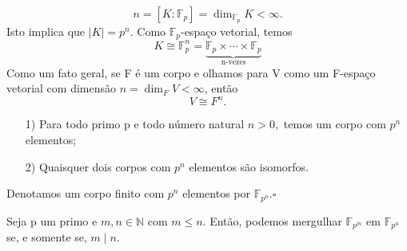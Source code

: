 \documentclass[algebraII_notes.tex]{subfiles}
\begin{document}
\[
	n = [K:\mathbb{F}_{p}] = \dim_{\mathbb{F}_{p}}K < \infty.
\]
Isto implica que \(|K| = p^{n}\). Como \(\mathbb{F}_{p}\)-espaço vetorial, temos
\[
	K\cong{\mathbb{F}_{p}^{n}} = \underbrace{\mathbb{F}_{p}\times \cdots\times \mathbb{F}_{p}}_{\text{n-vezes}}
\]
Como um fato geral, se F é um corpo e olhamos para V como um F-espaço vetorial com dimensão \(n = \dim_{F}V < \infty\), então
\[
	V\cong{F^{n}}.
\]
\begin{theorem*}
	\begin{itemize}
		\item[1)] Para todo primo p e todo número natural \(n > 0,\) temos um corpo com \(p^{n}\) elementos;
		\item[2)] Quaisquer dois corpos com \(p^{n}\) elementos são isomorfos.
	\end{itemize}
\end{theorem*}
\begin{def*}
	Denotamos um corpo finito com \(p^{n}\) elementos por \(\mathbb{F}_{p^{n}}.\square\)
\end{def*}
\begin{theorem*}
	Seja p um primo e \(m, n\in \mathbb{N}\) com \(m\leq n.\) Então, podemos mergulhar \(\mathbb{F}_{p^{m}}\) em \(\mathbb{F}_{p^{n}}\) se, e somente se, \(m\mid n.\)
\end{theorem*}
\end{document}
